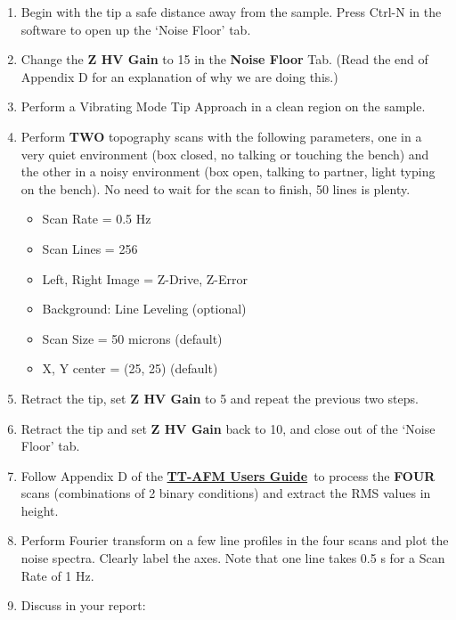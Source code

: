 \documentclass{../lab}
\newcommand{\afmuserguide}{\href{https://berkeley-physics111b.github.io/assets/pdf/oldwebsitestructure/AFMImages/TT_AFM\%20User-Guide-V2.2-600DPI.pdf}{\textbf{TT-AFM Users Guide}}}
\begin{document}
\begin{enumerate}
    \item Begin with the tip a safe distance away from the sample. Press Ctrl-N in the software to open up the `Noise Floor' tab.
    \item Change the \textbf{Z HV Gain} to 15 in the \textbf{Noise Floor} Tab. (Read the end of Appendix D for an explanation of why we are doing this.)
    \item Perform a Vibrating Mode Tip Approach in a clean region on the sample.
    \item Perform \textbf{TWO} topography scans with the following parameters, one in a very quiet environment (box closed, no talking or touching the bench) and the other in a noisy environment (box open, talking to partner, light typing on the bench). No need to wait for the scan to finish, 50 lines is plenty. 
    \begin{itemize}
        \item Scan Rate = 0.5 Hz
        \item Scan Lines = 256
        \item Left, Right Image = Z-Drive, Z-Error
        \item Background: Line Leveling (optional)
        \item Scan Size = 50 microns (default)
        \item X, Y center = (25, 25) (default)
    \end{itemize}
    
    \item Retract the tip, set \textbf{Z HV Gain} to 5 and repeat the previous two steps. 
    
    \item Retract the tip and set \textbf{Z HV Gain} back to 10, and close out of the `Noise Floor' tab.
    
    \item Follow Appendix D of the \afmuserguide \, to process the \textbf{FOUR} scans (combinations of 2 binary conditions) and extract the RMS values in height. 
    
    \item Perform Fourier transform on a few line profiles in the four scans and plot the noise spectra. Clearly label the axes. Note that one line takes 0.5 s for a Scan Rate of 1 Hz. 
    
    \item Discuss in your report:
    

\end{enumerate}
\end{document}
